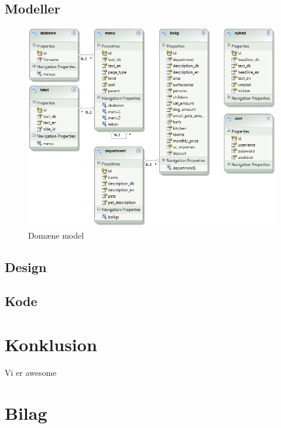 \documentclass[12pt, a4paper]{report}
\begin{document}
\section{Modeller}
\begin{figure}[ht]
\includegraphics[width=\textwidth]{model}
\caption{Domæne model}
\label{model}
\end{figure}

\section{Design}

\section{Kode}

\chapter{Konklusion}
Vi er awesome

\listoffigures

\chapter{Bilag}
\end{document}
